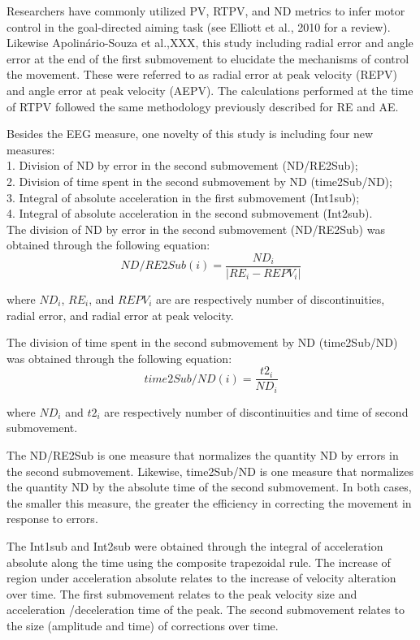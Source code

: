 \documentclass[man,a4paper,12pt,floatsintext]{apa6}
\begin{document}
Researchers have commonly utilized PV, RTPV, and ND metrics to infer motor control in the goal-directed aiming task (see Elliott et al., 2010 for a review). Likewise Apolinário-Souza et al.,XXX, this study including radial error and angle error at the end of the first submovement to elucidate the mechanisms of control the movement. These were referred to as radial error at peak velocity (REPV) and angle error at peak velocity (AEPV). The calculations performed at the time of RTPV followed the same methodology previously described for RE and AE. 

Besides the EEG measure, one novelty of this study is including four new measures:\\
1. Division of ND by error in the second submovement (ND/RE2Sub);\\
2. Division of time spent in the second submovement by ND (time2Sub/ND);\\
3. Integral of absolute acceleration in the first submovement (Int1sub);\\
4. Integral of absolute acceleration in the second submovement (Int2sub).\\

The division of ND by error in the second submovement (ND/RE2Sub) was obtained through the following equation:
\[ 
ND/RE2Sub(i) = \dfrac{ND_i}{|RE_i-REPV_i|}
\]

where $ND_i$, $RE_i$, and $REPV_i$ are are respectively number of discontinuities, radial error, and radial error at peak velocity. 

The division of time spent in the second submovement by ND (time2Sub/ND) was obtained through the following equation:
\[ 
time2Sub/ND(i) = \dfrac{t2_i}{ND_i}
\]

where $ND_i$ and $t2_i$ are respectively number of discontinuities and time of second submovement.

The ND/RE2Sub is one measure that normalizes the quantity ND by errors in the second submovement. Likewise, time2Sub/ND is one measure that normalizes the quantity ND by the absolute time of the second submovement. In both cases,  the smaller this measure, the greater the efficiency in correcting the movement in response to errors. 

The Int1sub and Int2sub were obtained through the integral of acceleration absolute along the time using the composite trapezoidal rule. The increase of region under acceleration absolute relates to the increase of velocity alteration over time. The first submovement relates to the peak velocity size and acceleration /deceleration time of the peak. The second submovement relates to the size (amplitude and time) of corrections over time.
\end{document}
